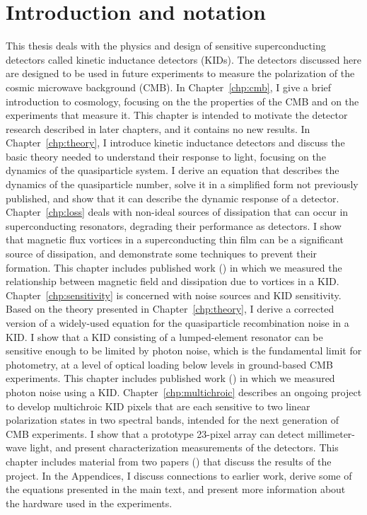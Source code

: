 \chapter{Introduction and notation}
\label{chp:introduction}

This thesis deals with the physics and design of sensitive superconducting detectors called kinetic inductance detectors (KIDs).
The detectors discussed here are designed to be used in future experiments to measure the polarization of the cosmic microwave background (CMB).
In Chapter~\ref{chp:cmb}, I give a brief introduction to cosmology, focusing on the the properties of the CMB and on the experiments that measure it.
This chapter is intended to motivate the detector research described in later chapters, and it contains no new results.
In Chapter~\ref{chp:theory}, I introduce kinetic inductance detectors and discuss the basic theory needed to understand their response to light, focusing on the dynamics of the quasiparticle system.
I derive an equation that describes the dynamics of the quasiparticle number, solve it in a simplified form not previously published, and show that it can describe the dynamic response of a detector. 
Chapter~\ref{chp:loss} deals with non-ideal sources of dissipation that can occur in superconducting resonators, degrading their performance as detectors.
I show that magnetic flux vortices in a superconducting thin film can be a significant source of dissipation, and demonstrate some techniques to prevent their formation.
This chapter includes published work (\textcite{Flanigan2016bAPL}) in which we measured the relationship between magnetic field and dissipation due to vortices in a KID.
Chapter~\ref{chp:sensitivity} is concerned with noise sources and KID sensitivity.
Based on the theory presented in Chapter~\ref{chp:theory}, I derive a corrected version of a widely-used equation for the quasiparticle recombination noise in a KID.
I show that a KID consisting of a lumped-element resonator can be sensitive enough to be limited by photon noise, which is the fundamental limit for photometry, at a level of optical loading below levels in ground-based CMB experiments.
This chapter includes published work (\textcite{Flanigan2016aAPL}) in which we measured photon noise using a KID.
Chapter~\ref{chp:multichroic} describes an ongoing project to develop multichroic KID pixels that are each sensitive to two linear polarization states in two spectral bands, intended for the next generation of CMB experiments.
I show that a prototype 23-pixel array can detect millimeter-wave light, and present characterization measurements of the detectors.
This chapter includes material from two papers (\textcite{Johnson2016SPIE, Johnson2017arXiv}) that discuss the results of the project.
In the Appendices, I discuss connections to earlier work, derive some of the equations presented in the main text, and present more information about the hardware used in the experiments.


